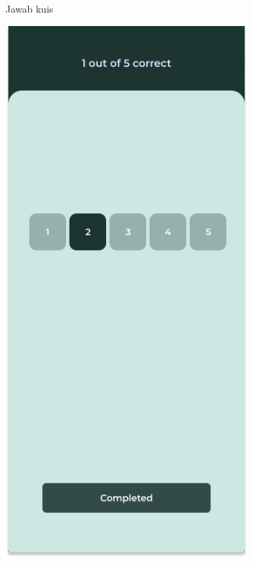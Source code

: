 \begin{figure}[H]
\begin{subfigure}[b]{0.23\textwidth}
	  \caption{Jawab kuis}
	  \label{fig:pilihJawabanDark}
	\end{subfigure}
	\begin{subfigure}[b]{0.23\textwidth}
		\centering
	  \includegraphics[width=\linewidth]{contents/chapter-3/images/HF-kuis2-dt.png}

\end{subfigure}
\end{figure}
